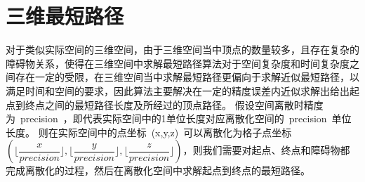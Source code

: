 \section{三维最短路径}
\par 对于类似实际空间的三维空间，由于三维空间当中顶点的数量较多，且存在复杂的障碍物关系，使得在三维空间中求解最短路径算法对于空间复杂度和时间复杂度之间存在一定的受限，在三维空间当中求解最短路径更偏向于求解近似最短路径，以满足时间和空间的要求，因此算法主要解决在一定的精度误差内近似求解出给出起点到终点之间的最短路径长度及所经过的顶点路径。
假设空间离散时精度为~precision~，即代表实际空间中的1单位长度对应离散化空间的~precision~单位长度。
则在实际空间中的点坐标~(x,y,z)~可以离散化为格子点坐标$(\lfloor\dfrac{x}{precision}\rfloor,\lfloor\dfrac{y}{precision}\rfloor,\lfloor\dfrac{z}{precision}\rfloor)$，则我们需要对起点、终点和障碍物都完成离散化的过程，然后在离散化空间中求解起点到终点的最短路径。

